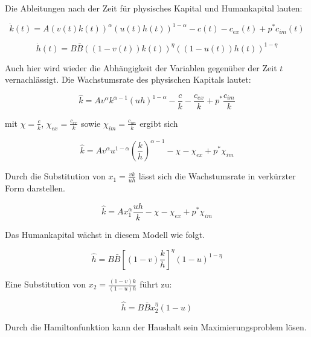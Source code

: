 

Die Ableitungen nach der Zeit für physisches Kapital und Humankapital lauten:


	\begin{equation}
		\dot{k}(t)=A(v(t)k(t))^\alpha(u(t)h(t))^{1-\alpha}-c(t)-c_{ex}(t)+p^*c_{im}(t)
	\end{equation}


	\begin{equation}
		\dot{h}(t)=B\bar{B}((1-v(t))k(t))^{\eta}((1-u(t))h(t))^{1-\eta}
	\end{equation}


Auch hier wird wieder die Abhängigkeit der Variablen gegenüber der Zeit $t$ vernachlässigt. Die Wachstumsrate des physischen Kapitals lautet: 


	\begin{equation*}
		\hat{k}=Av^\alpha k^{\alpha-1}(uh)^{1-\alpha}-\frac{c}{k}-\frac{c_{ex}}{k}+p^*\frac{c_{im}}{k}
	\end{equation*}


mit $\chi=\frac{c}{k}$, $\chi_{ex}=\frac{c_{ex}}{k}$ sowie $\chi_{im}=\frac{c_{im}}{k}$ ergibt sich


	\begin{equation}
		\hat{k}=Av^\alpha u^{1-\alpha}\left(\frac{k}{h}\right)^{\alpha-1}-\chi-\chi_{ex}+p^*\chi_{im}
	\end{equation}


Durch die Substitution von $x_1=\frac{vk}{uh}$ lässt sich die Wachstumsrate in verkürzter Form darstellen. 


	\begin{equation}
		\boxed{\hat{k}=Ax_1^\alpha \frac{uh}{k}-\chi-\chi_{ex}+p^*\chi_{im}}
	\end{equation}

Das Humankapital wächst in diesem Modell wie folgt. 


	\begin{equation}
		\hat{h}=B\bar{B}\left[(1-v)\frac{k}{h}\right]^{\eta}(1-u)^{1-\eta}
	\end{equation}


Eine Substitution von $x_2=\frac{(1-v)k}{(1-u)h}$ führt zu: 


	\begin{equation}
		\boxed{\hat{h}=B\bar{B}x_2^\eta(1-u)}
	\end{equation}

Durch die Hamiltonfunktion kann der Haushalt sein Maximierungsproblem lösen.\\



